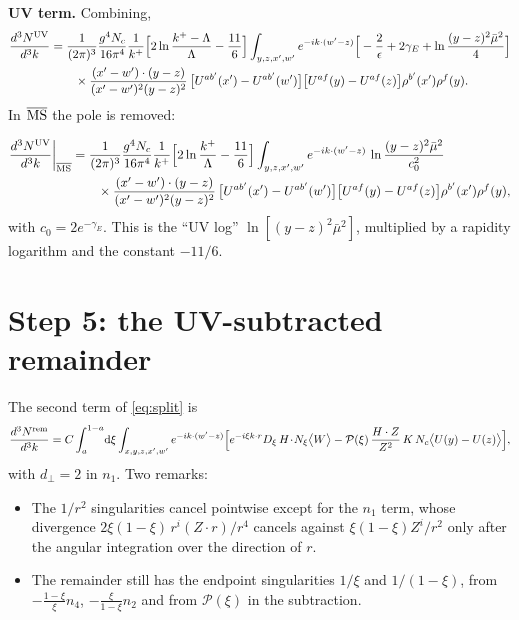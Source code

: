 \documentclass[11pt,a4paper]{article}
\newcommand{\dd}{\mathrm{d}}
\newcommand{\Nc}{N_c}
\newcommand{\MSbar}{\overline{\rm MS}}
\newcommand{\mubar}{\bar\mu}
\newcommand{\cl}[1]{\big\langle #1\big\rangle}
\begin{document}
\textbf{UV term.} Combining,
\begin{align}
\frac{d^3N^{\rm UV}}{d^3k}&=\frac{1}{(2\pi)^3}\frac{g^4\Nc}{16\pi^4}\frac{1}{k^+}
\Big[2\ln\frac{k^+-\Lambda}{\Lambda}-\frac{11}{6}\Big]
\int_{y,z,x',w'}e^{-ik\cdot(w'-z)}\Big[-\frac2\epsilon+2\gamma_E+\ln\frac{(y-z)^2\mubar^2}{4}\Big]\notag\\
&\qquad\times\frac{(x'-w')\cdot(y-z)}{(x'-w')^2(y-z)^2}\,
\big[U^{ab'}(x')-U^{ab'}(w')\big]\big[U^{af}(y)-U^{af}(z)\big]\rho^{b'}(x')\rho^f(y).
\end{align}
In $\MSbar$ the pole is removed:
\begin{result}
\begin{align}
\frac{d^3N^{\rm UV}}{d^3k}\bigg|_{\MSbar}&=\frac{1}{(2\pi)^3}\frac{g^4\Nc}{16\pi^4}\frac{1}{k^+}
\Big[2\ln\frac{k^+}{\Lambda}-\frac{11}{6}\Big]
\int_{y,z,x',w'}e^{-ik\cdot(w'-z)}\,\ln\frac{(y-z)^2\mubar^2}{c_0^2}\notag\\
&\qquad\times\frac{(x'-w')\cdot(y-z)}{(x'-w')^2(y-z)^2}\,
\big[U^{ab'}(x')-U^{ab'}(w')\big]\big[U^{af}(y)-U^{af}(z)\big]\rho^{b'}(x')\rho^f(y),
\label{eq:UVfinal}
\end{align}
with $c_0=2e^{-\gamma_E}$. This is the ``UV log'' $\ln[(y-z)^2\mubar^2]$, multiplied by a rapidity
logarithm and the constant $-11/6$.
\end{result}

\section{Step 5: the UV-subtracted remainder}
The second term of \eqref{eq:split} is
\begin{equation}
\frac{d^3N^{\rm rem}}{d^3k}=C\int_a^{1-a}\!\dd\xi\int_{x,y,z,x',w'}e^{-ik\cdot(w'-z)}
\Big[e^{-i\xi k\cdot r}D_\xi\,H\!\cdot\!N_\xi\cl{W}
-\mathcal P(\xi)\,\frac{H\cdot Z}{Z^2}\,K\,\Nc\cl{U(y)-U(z)}\Big],
\label{eq:rem}
\end{equation}
with $d_\perp=2$ in $n_1$. Two remarks:
\begin{itemize}
\item The $1/r^2$ singularities cancel pointwise except for the $n_1$ term, whose divergence
$2\xi(1-\xi)\,r^i(Z\!\cdot\! r)/r^4$ cancels against $\xi(1-\xi)Z^i/r^2$ only after the angular
integration over the direction of $r$.
\item The remainder still has the endpoint singularities $1/\xi$ and $1/(1-\xi)$, from
$-\frac{1-\xi}{\xi}n_4$, $-\frac{\xi}{1-\xi}n_2$ and from $\mathcal P(\xi)$ in the subtraction.
\end{itemize}
\end{document}
